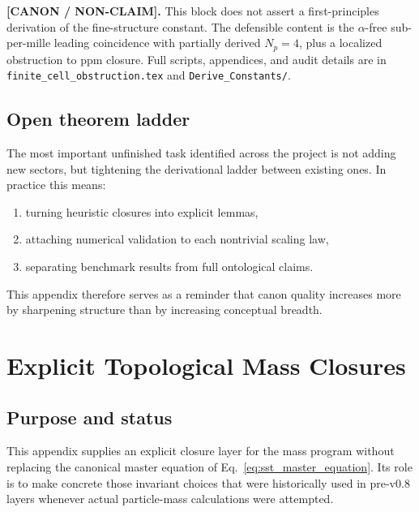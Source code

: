\documentclass[11pt]{article}
\theoremstyle{definition}
\theoremstyle{plain}
\theoremstyle{remark}
\begin{document}
            \textbf{[CANON / NON-CLAIM].}
            This block does not assert a first-principles derivation of the fine-structure
            constant. The defensible content is the $\alpha$-free sub-per-mille leading
            coincidence with partially derived $N_p=4$, plus a localized obstruction to
            ppm closure. Full scripts, appendices, and audit details are in
            \texttt{finite\_cell\_obstruction.tex} and \texttt{Derive\_Constants/}.
        \subsection{Open theorem ladder}
            The most important unfinished task identified across the project is not adding new sectors, but tightening the derivational ladder between existing ones. In practice this means:
            \begin{enumerate}
                \item turning heuristic closures into explicit lemmas,
                \item attaching numerical validation to each nontrivial scaling law,
                \item separating benchmark results from full ontological claims.
            \end{enumerate}
            This appendix therefore serves as a reminder that canon quality increases more by sharpening structure than by increasing conceptual breadth.

 
        \newpage
    
    
    \section{Explicit Topological Mass Closures}
    \label{sec:appendix_explicit_mass}
    
    \subsection{Purpose and status}
        This appendix supplies an explicit closure layer for the mass program without replacing the canonical master equation of Eq.~\eqref{eq:sst_master_equation}. Its role is to make concrete those invariant choices that were historically used in pre-v0.8 layers whenever actual particle-mass calculations were attempted.
        
\end{document}
